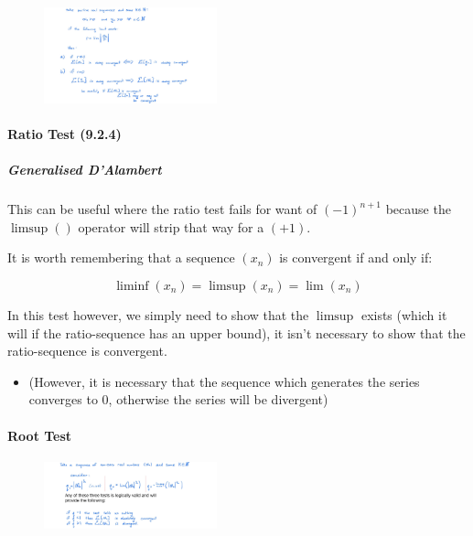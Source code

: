 \documentclass[class=article, crop=false]{standalone}
\begin{document}
\begin{figure}
\centering
\includegraphics[width=5cm]{media/InfSeries/DEEDB59D-00EA-4BF3-A5F9-7571412B11C2.jpeg}
\caption{}
\end{figure}

\newpage
\hypertarget{header-n3259}{%
\paragraph{Ratio Test (9.2.4)}\label{header-n3259}}

\hypertarget{header-n3261}{%
\subparagraph{Generalised D'Alambert}\label{header-n3261}}

This can be useful where the ratio test fails for want of \((-1)^{n+1}\)
because the \(\limsup()\) operator will strip that way for a \((+1)\).

It is worth remembering that a sequence \((x_n)\) is convergent if and
only if:

\[\liminf(x_n) = \limsup(x_n)=\lim(x_n)\]

In this test however, we simply need to show that the \(\limsup\) exists
(which it will if the ratio-sequence has an upper bound), it isn't
necessary to show that the ratio-sequence is convergent.

\begin{itemize}
\item
  (However, it is necessary that the sequence which generates the series
  converges to 0, otherwise the series will be divergent)
\end{itemize}

\newpage 

\hypertarget{header-n3270}{%
\paragraph{Root Test}\label{header-n3270}}

\begin{figure}
\centering
\includegraphics[width=5cm]{media/InfSeries/8D469008-5118-4138-808A-3A9480B23FA5.jpeg}
\caption{}
\end{figure}
\end{document}
